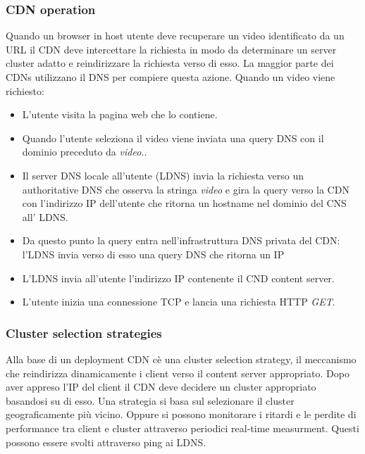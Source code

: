 \subsubsection{CDN operation}
Quando un browser in host utente deve recuperare un video identificato da un URL il CDN deve intercettare la richiesta in modo da determinare un server
cluster adatto e reindirizzare la richiesta verso di esso. La maggior parte dei CDNs utilizzano il DNS per compiere questa azione. Quando un video viene
richiesto:
\begin{itemize}
\item L'utente visita la pagina web che lo contiene.
\item Quando l'utente seleziona il video viene inviata una query DNS con il dominio preceduto da \emph{video.}.
\item Il server DNS locale all'utente (LDNS) invia la richiesta verso un authoritative DNS che osserva la stringa \emph{video} e gira la query verso la CDN 
con l'indirizzo IP dell'utente che ritorna un hostname nel dominio del CNS all' LDNS.
\item Da questo punto la query entra nell'infrastruttura DNS privata del CDN: l'LDNS invia verso di esso una query DNS che ritorna un IP
\item L'LDNS invia all'utente l'indirizzo IP contenente il CND content server.
\item L'utente inizia una connessione TCP e lancia una richiesta HTTP \emph{GET}.
\end{itemize}
\subsubsection{Cluster selection strategies}
Alla base di un deployment CDN c\`e una cluster selection strategy, il meccanismo che reindirizza dinamicamente i client verso il content server 
appropriato. Dopo aver appreso l'IP del client il CDN deve decidere un cluster appropriato basandosi su di esso. Una strategia si basa sul selezionare
il cluster geograficamente pi\`u vicino. Oppure si possono monitorare i ritardi e le perdite di performance tra client e cluster attraverso periodici 
real-time measurment. Questi possono essere svolti attraverso ping ai LDNS.